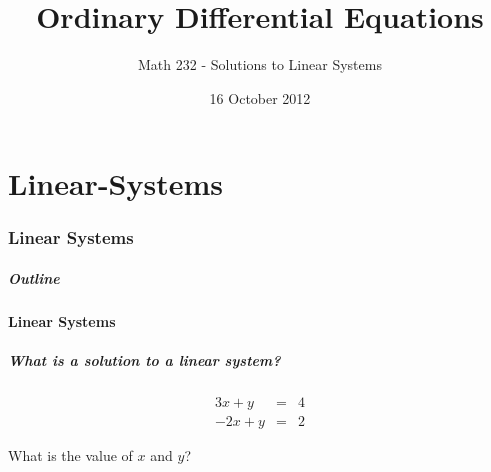 \part{Linear-Systems}
\section{Linear Systems}

\title{Ordinary Differential Equations}
\subtitle{Math 232 - Solutions to Linear Systems}
\date{16 October 2012}

\begin{frame}
  \titlepage
\end{frame}

\begin{frame}
  \frametitle{Outline}
  \tableofcontents[ currentsection ]
\end{frame}


\subsection{Linear Systems}


\begin{frame}
  \frametitle{What is a solution to a linear system?}

  \begin{eqnarray*}
    3x + y & = & 4 \\
    -2x + y & = & 2
  \end{eqnarray*}

  What is the value of $x$ and $y$?


\end{frame}


